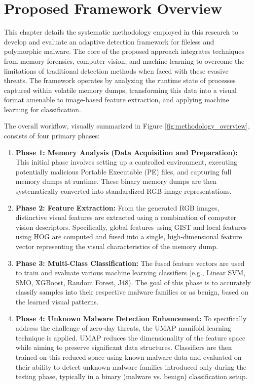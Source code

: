 \section{Proposed Framework Overview}
\label{sec:framework_overview}

This chapter details the systematic methodology employed in this research to develop and evaluate an adaptive detection framework for fileless and polymorphic malware. The core of the proposed approach integrates techniques from memory forensics, computer vision, and machine learning to overcome the limitations of traditional detection methods when faced with these evasive threats. The framework operates by analyzing the runtime state of processes captured within volatile memory dumps, transforming this data into a visual format amenable to image-based feature extraction, and applying machine learning for classification.

The overall workflow, visually summarized in Figure \ref{fig:methodology_overview}, consists of four primary phases:

\begin{enumerate}
    \item \textbf{Phase 1: Memory Analysis (Data Acquisition and Preparation):} This initial phase involves setting up a controlled environment, executing potentially malicious Portable Executable (PE) files, and capturing full memory dumps at runtime. These binary memory dumps are then systematically converted into standardized RGB image representations.
    \item \textbf{Phase 2: Feature Extraction:} From the generated RGB images, distinctive visual features are extracted using a combination of computer vision descriptors. Specifically, global features using GIST \citep{oliva2001modeling} and local features using HOG \citep{dalal2005histograms} are computed and fused into a single, high-dimensional feature vector representing the visual characteristics of the memory dump.
    \item \textbf{Phase 3: Multi-Class Classification:} The fused feature vectors are used to train and evaluate various machine learning classifiers (e.g., Linear SVM, SMO, XGBoost, Random Forest, J48). The goal of this phase is to accurately classify samples into their respective malware families or as benign, based on the learned visual patterns.
    \item \textbf{Phase 4: Unknown Malware Detection Enhancement:} To specifically address the challenge of zero-day threats, the UMAP \citep{mcinnes2018umap} manifold learning technique is applied. UMAP reduces the dimensionality of the feature space while aiming to preserve significant data structures. Classifiers are then trained on this reduced space using known malware data and evaluated on their ability to detect unknown malware families introduced only during the testing phase, typically in a binary (malware vs. benign) classification setup.
\end{enumerate}

